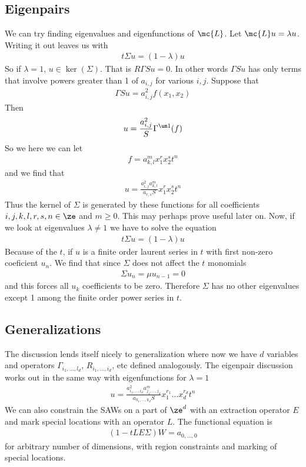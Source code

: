\subsection{Eigenpairs}
We can try finding eigenvalues and eigenfunctions of $\mc{L}$. Let $\mc{L}u = \lambda u$. Writing it out leaves us with
\begin{align}
	t\Sigma u = (1-\lambda)u
\end{align}
So if $\lambda = 1$, $u\in \ker(\Sigma)$. That is $R\Gamma S u = 0$. In other words $\Gamma S u$ has only terms that involve powers greater than 1 of $a_{i,j}$ for various $i,j$. Suppose that
\begin{align}
	\Gamma S u = a_{i,j}^2 f(x_1,x_2)
\end{align}
Then
\begin{align}
	u  = \frac{a_{i,j}^2}{S}\Gamma^{\um 1}(f)
\end{align}
So we here we can let
\begin{align}
		f = a_{k,l}^m x_1^rx_2^s t^n
\end{align}
and we find that
\begin{align}
	u =  \frac{a_{i,j}^2 a_{k,l}^m}{a_{r,s}S}x_1^r x_2^s t^n
\end{align}
Thus the kernel of $\Sigma$ is generated by these functions for all coefficients $i,j,k,l,r,s,n \in \ze$ and $m\ge 0$. This may perhaps prove useful later on. Now, if we look at eigenvalues $\lambda \neq 1$ we have to solve the equation
\begin{align}
	t \Sigma u = (1-\lambda) u
\end{align}
Because of the $t$, if $u$ is a finite order laurent series in $t$ with first non-zero coeficient $u_n$. We find that since $\Sigma$ does not affect the $t$ monomials
\begin{align}
	\Sigma u_n = \mu u_{n-1} = 0
\end{align}
and this forces all $u_k$ coefficients to be zero. Therefore $\Sigma$ has no other eigenvalues except 1 among the finite order power series in $t$.
\subsection{Generalizations}

The discussion lends itself nicely to generalization where now we have $d$ variables and operators $\Gamma_{i_1,\ldots,l_d}$, $R_{i_1,\ldots,i_d}$, etc defined analogously. The eigenpair discussion works out in the same way with eigenfunctions for $\lambda = 1$
\begin{align}
	u = \frac{a_{i_1,\ldots,i_d}^2 a_{j_1,\ldots,j_d}^m}{a_{k_1,\ldots,k_d}S}x_1^{r_1}\ldots x_d^{r_d} t^n
\end{align}
We can also constrain the SAWs on a part of $\ze^d$ with an extraction operator $E$ and mark special locations with an operator $L$. The functional equation is
\begin{align}
	(1- tLE\Sigma)W = a_{0,\ldots,0}
\end{align}
for arbitrary number of dimensions, with region constraints and marking of special locations.


